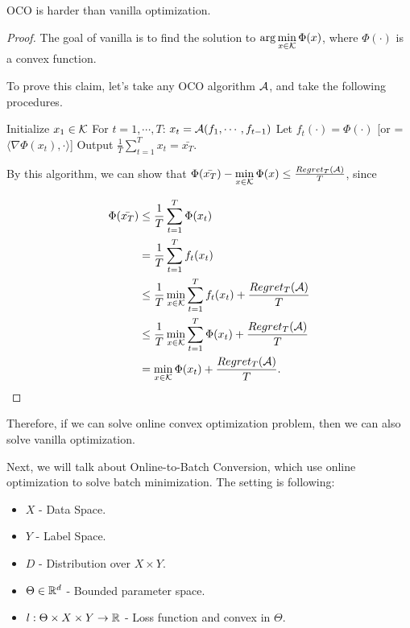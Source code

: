 \documentclass[../main.tex]{subfiles}
\begin{document}
\begin{claim}
	OCO is harder than vanilla optimization.
\end{claim}

\begin{proof}
	The goal of vanilla is to find the solution to $\arg\min\limits_{x\in \mathcal{K}} \Phi(x)$, where $\Phi(\cdot)$ is a convex function.
	
	To prove this claim, let's take any OCO algorithm $\mathcal{A}$, and take the following procedures.
	
\begin{algorithm}
	\begin{algorithmic}
		\STATE Initialize $x_1 \in \mathcal{K}$
		\STATE For $t = 1,\cdots ,T$:
		\bindent 
			\STATE $x_t = \mathcal{A}(f_1, \cdots, f_{t-1})$
			\STATE Let $f_t(\cdot) = \Phi(\cdot)$ [or = $\langle \nabla \Phi(x_t), \cdot \rangle$]
		\eindent
		\STATE Output $\frac{1}{T} \sum\limits_{t=1}^T x_t = \bar{x_T}$.
	\end{algorithmic}
\end{algorithm}

By this algorithm, we can show that $\Phi(\bar{x_T}) - \min\limits_{x \in \mathcal{K}} \Phi(x) \leq \frac{Regret_T(\mathcal{A})}{T}$, since

\begin{equation*}
	\begin{aligned}
		\Phi(\bar{x_T}) & \leq \frac{1}{T} \sum\limits_{t=1}^T \Phi(x_t) \\
		& = \frac{1}{T}  \sum\limits_{t=1}^T f_t(x_t) \\
		& \leq \frac{1}{T}\min\limits_{x \in \mathcal{K}}  \sum\limits_{t=1}^T  f_t(x_t) +  \frac{Regret_T(\mathcal{A})}{T} \\
		& \leq \frac{1}{T}\min\limits_{x \in \mathcal{K}}  \sum\limits_{t=1}^T  \Phi(x_t) +  \frac{Regret_T(\mathcal{A})}{T} \\
		& =  \min\limits_{x \in \mathcal{K}}  \Phi(x_t) +  \frac{Regret_T(\mathcal{A})}{T}.
	\end{aligned}
\end{equation*}
\end{proof}

Therefore, if we can solve online convex optimization problem, then we can also solve vanilla optimization.

Next, we will talk about Online-to-Batch Conversion, which use online optimization to solve batch minimization. The setting is following:

\begin{itemize}
	\item $X$ - Data Space.
	\item $Y$ - Label Space.
	\item $D$ - Distribution over $X \times Y$.
	\item $\Theta \in \mathbb{R}^d$ - Bounded parameter space.
	\item $l: \Theta \times X \times Y \to \mathbb{R}$ - Loss function and convex in $\Theta$.
\end{itemize}
\end{document}
